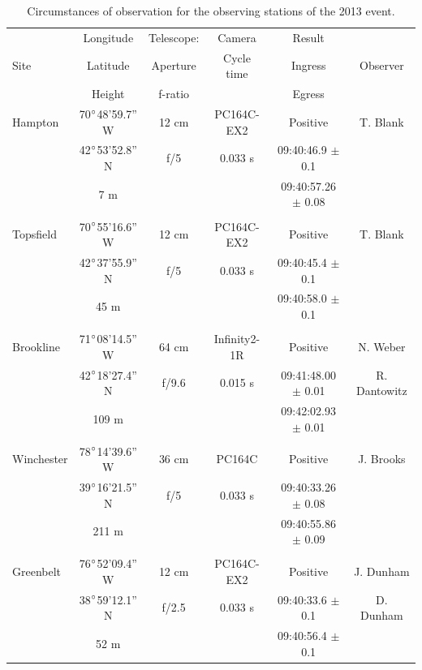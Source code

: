 \documentclass[useAMS,usenatbib]{mn2e}
\begin{document}
\begin{table}
 \centering
 \begin{minipage}{140mm}
  \caption{Circumstances of observation for the observing stations of the 2013 event.\label{Tab: obs-2013}}
  \begin{tabular}{@{}lccccc}
  \hline
          & Longitude & Telescope: & Camera  & Result &   \\
     Site & Latitude  & Aperture  & Cycle time & Ingress & Observer\\          
          & Height    & f-ratio    &           & Egress    & \\          
\hline
 Hampton & 70$\hbox{$^\circ$}$48'59.7'' W & 12 cm & PC164C-EX2 & Positive & T. Blank \\
  &42$\hbox{$^\circ$}$53'52.8'' N & f/5 & 0.033 s     & 09:40:46.9 $\pm$ 0.1 &   \\
            & 7 m       &  &     & 09:40:57.26  $\pm$ 0.08 &   \\
 & & & & & \\
 Topsfield & 70$\hbox{$^\circ$}$55'16.6'' W & 12 cm & PC164C-EX2 & Positive & T. Blank \\
  &42$\hbox{$^\circ$}$37'55.9'' N & f/5      & 0.033 s   & 09:40:45.4 $\pm$ 0.1 &   \\
            & 45 m      &  &     & 09:40:58.0  $\pm$ 0.1 &   \\
 & & & & & \\
 Brookline & 71$\hbox{$^\circ$}$08'14.5'' W & 64 cm & Infinity2-1R & Positive & N. Weber \\
  &42$\hbox{$^\circ$}$18'27.4'' N & f/9.6 & 0.015 s     & 09:41:48.00 $\pm$ 0.01&  R. Dantowitz  \\
            & 109 m     &       &     & 09:42:02.93 $\pm$ 0.01   \\
 & & & & & \\
 Winchester & 78$\hbox{$^\circ$}$14'39.6'' W & 36 cm & PC164C & Positive & J. Brooks \\
  &39$\hbox{$^\circ$}$16'21.5'' N & f/5 & 0.033 s    & 09:40:33.26 $\pm$ 0.08 &   \\
            & 211 m     &  &     & 09:40:55.86  $\pm$ 0.09 &   \\
 & & & & & \\
 Greenbelt & 76$\hbox{$^\circ$}$52'09.4'' W & 12 cm & PC164C-EX2 & Positive & J. Dunham \\
  &38$\hbox{$^\circ$}$59'12.1'' N & f/2.5 & 0.033 s    & 09:40:33.6 $\pm$ 0.1 & D. Dunham  \\
            & 52 m      &   &     & 09:40:56.4  $\pm$ 0.1 &   \\

\end{tabular}
\end{minipage}
\end{table}
\end{document}
